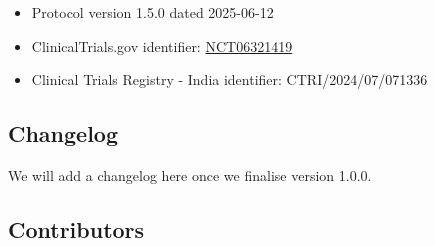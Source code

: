 \documentclass[
]{scrartcl}
\begin{document}
\begin{itemize}
\item
  Protocol version 1.5.0 dated 2025-06-12
\item
  ClinicalTrials.gov identifier:
  \href{https://clinicaltrials.gov/ct2/show/NCT06321419}{NCT06321419}
\item
  Clinical Trials Registry - India identifier: CTRI/2024/07/071336
\end{itemize}

\subsection{Changelog}\label{sec-changelog}

We will add a changelog here once we finalise version 1.0.0.

\subsection{Contributors}\label{sec-contributors}
\end{document}
